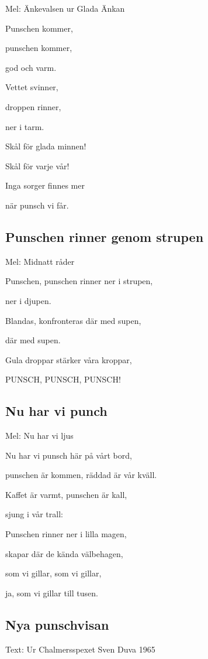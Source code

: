 Mel: Änkevalsen ur Glada Änkan\bigskip

Punschen kommer,

punschen kommer,

god och varm.

Vettet svinner,

droppen rinner,

ner i tarm.

Skål för glada minnen!

Skål för varje vår!

Inga sorger finnes mer

när punsch vi får.

\subsection{\textbf{Punschen rinner genom strupen}}

Mel: Midnatt råder\bigskip


Punschen, punschen rinner ner i strupen,

ner i djupen.

Blandas, konfronteras där med supen,

där med supen.

Gula droppar stärker våra kroppar,

PUNSCH, PUNSCH, PUNSCH!


\subsection{\textbf{Nu har vi punch}}

Mel: Nu har vi ljus\bigskip


Nu har vi punsch här på vårt bord,

punschen är kommen, räddad är vår kväll.

Kaffet är varmt, punschen är kall,

sjung i vår trall:

Punschen rinner ner i lilla magen,

skapar där de kända välbehagen,

som vi gillar, som vi gillar,

ja, som vi gillar till tusen.

\subsection{\textbf{Nya punschvisan}}

Text: Ur Chalmersspexet Sven Duva 1965


